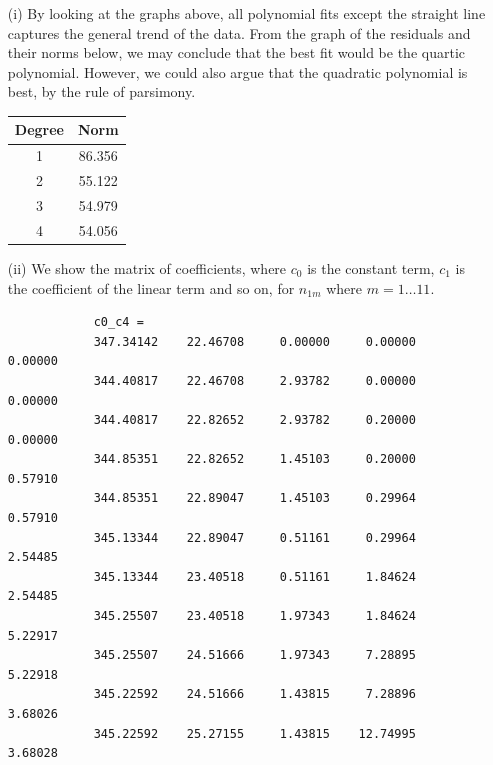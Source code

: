 \documentclass[11pt,a4paper]{article}
\begin{document}
\begin{enumerate}
\begin{center}
		\end{center}
	\begin{enumerate}
		\item[(i)] By looking at the graphs above, all polynomial fits except the straight line captures the general trend of the data. From the graph of the residuals and their norms below, we may conclude that the best fit would be the quartic polynomial. However, we could also argue that the quadratic polynomial is best, by the rule of parsimony. 
		\begin{center}
			\begin{tabular}{|c|c|}
			\hline
			Degree &Norm \\
			\hline
			1 &86.356 \\
			2 &55.122 \\
			3 &54.979 \\
			4 &54.056 \\
			\hline
			\end{tabular}
		\end{center}
		\item[(ii)] We show the matrix of coefficients, where $c_0$ is the constant term, $c_1$ is the coefficient of the linear term and so on, for $n_{1m}$ where $m=1 \ldots 11$.

		\begin{verbatim}
			c0_c4 =
			347.34142    22.46708     0.00000     0.00000     0.00000
			344.40817    22.46708     2.93782     0.00000     0.00000
			344.40817    22.82652     2.93782     0.20000     0.00000
			344.85351    22.82652     1.45103     0.20000     0.57910
			344.85351    22.89047     1.45103     0.29964     0.57910
			345.13344    22.89047     0.51161     0.29964     2.54485
			345.13344    23.40518     0.51161     1.84624     2.54485
			345.25507    23.40518     1.97343     1.84624     5.22917
			345.25507    24.51666     1.97343     7.28895     5.22918
			345.22592    24.51666     1.43815     7.28896     3.68026
			345.22592    25.27155     1.43815    12.74995     3.68028
			

\end{verbatim}
\end{enumerate}
\end{enumerate}
\end{document}
